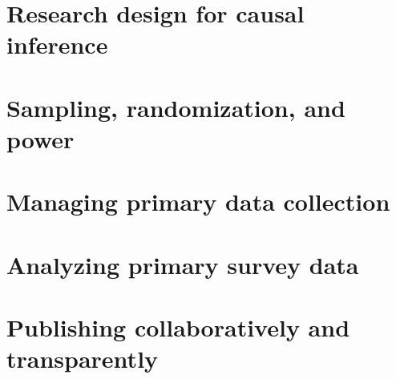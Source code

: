 \chapter{Research design for causal inference}
\label{ch:3}




\chapter{Sampling, randomization, and power}
\label{ch:4}




\chapter{Managing primary data collection}
\label{ch:5}




\chapter{Analyzing primary survey data}
\label{ch:6}




\chapter{Publishing collaboratively and transparently}
\label{ch:7}



